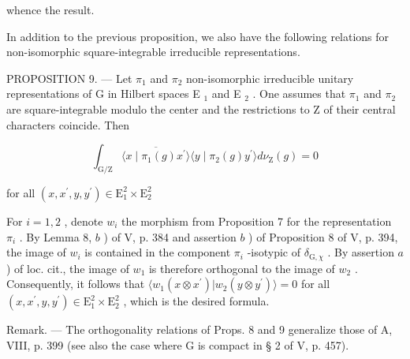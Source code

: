 whence the result.

In addition to the previous proposition, we also have the following relations for non-isomorphic square-integrable irreducible representations.

PROPOSITION 9. --- Let \(\pi_1\) and \(\pi_2\) non-isomorphic irreducible unitary representations of G in Hilbert spaces E \(_1\) and E \(_2\) . One assumes that \(\pi_1\) and \(\pi_2\) are square-integrable modulo the center and the restrictions to Z of their central characters coincide. Then

\[
\int_ {\mathrm{G} / \mathrm{Z}} \overline {{\langle x \mid \pi_ {1} (g) x ^ {\prime} \rangle}} \langle y \mid \pi_ {2} (g) y ^ {\prime} \rangle d \nu_ {\mathrm{Z}} (g) = 0
\]

for all \((x,x^{\prime},y,y^{\prime})\in \mathrm{E}_{1}^{2}\times \mathrm{E}_{2}^{2}\)

 For \(i=1,2\) , denote \(w_{i}\) the morphism from Proposition 7 for the representation \(\pi_{i}\) . By Lemma 8, \(b\) ) of V, p. 384 and assertion \(b\) ) of Proposition 8 of V, p. 394, the image of \(w_{i}\) is contained in the component \(\pi_{i}\) -isotypic of \(\delta_{\mathrm{G},\chi}\) . By assertion \(a\) ) of loc. cit., the image of \(w_{1}\) is therefore orthogonal to the image of \(w_{2}\) . Consequently, it follows that \(\langle w_{1}(x\otimes x^{\prime})|w_{2}(y\otimes y^{\prime})\rangle=0\) for all \((x,x^{\prime},y,y^{\prime})\in\mathrm{E}_{1}^{2}\times\mathrm{E}_{2}^{2}\) , which is the desired formula.

Remark. --- The orthogonality relations of Props. 8 and 9 generalize those of A, VIII, p. 399 (see also the case where G is compact in § 2 of V, p. 457).


